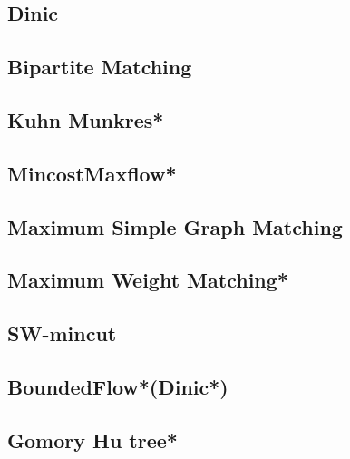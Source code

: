 \subsection{Dinic}

\subsection{Bipartite Matching} %
% 

\subsection{Kuhn Munkres*} %

\subsection{MincostMaxflow*} %

\subsection{Maximum Simple Graph Matching} %

\subsection{Maximum Weight Matching*} %

\subsection{SW-mincut}

\subsection{BoundedFlow*(Dinic*)} %

\subsection{Gomory Hu tree*} %

